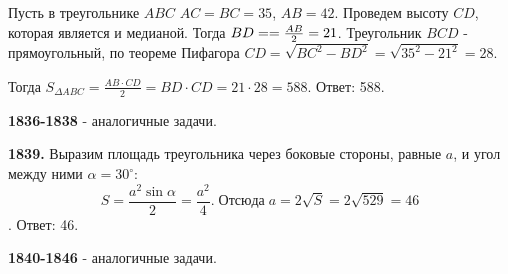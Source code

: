 Пусть в треугольнике $ABC$ $AC = BC = 35$, $AB = 42$. Проведем высоту $CD$, которая является и медианой. Тогда $BD = \linebreak =\frac{AB}{2} = 21$. Треугольник  $BCD$ - прямоугольный, по теореме Пифагора $CD = \sqrt{BC^2 - BD^2} = \sqrt{35^2 - 21^2} = 28.$

Тогда $S_{\Delta ABC} = \frac{AB \cdot CD}{2} = BD \cdot CD = 21 \cdot 28 = 588.$ \newline \null \hspace*{\fill} Ответ: 588.

\textbf{1836-1838} - аналогичные задачи.

\textbf{1839.}  Выразим площадь треугольника через боковые стороны, равные $a$, и угол между ними $\alpha = 30^\circ$:
\[
S = \frac{a^2 \sin{\alpha}}{2} = \frac{a^2}{4}.\; Отсюда \;a = 2\sqrt{S} = 2\sqrt{529} = 46
\]. \null \hspace*{\fill} Ответ: 46.

\textbf{1840-1846} - аналогичные задачи.